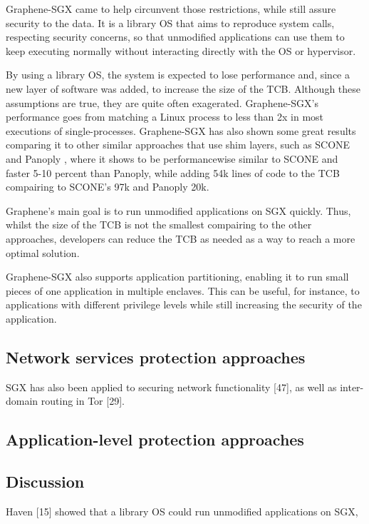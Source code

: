 Graphene-SGX \cite{graphenePaper} came to help circunvent those restrictions, while still assure security to the data. It is a library OS that aims to reproduce system calls, respecting security concerns, so that unmodified applications can use them to keep executing normally without interacting directly with the OS or hypervisor. 

By using a library OS, the system is expected to lose performance and, since a new layer of software was added, to increase the size of the TCB. 
Although these assumptions are true, they are quite often exagerated. Graphene-SGX's performance goes from matching a Linux process to less than 2x in most executions of single-processes.
Graphene-SGX has also shown some great results comparing it to other similar approaches that use shim layers, such as SCONE \cite{sconePaper} and Panoply \cite{panoplyPaper}, where it shows to be performancewise similar to SCONE and faster 5-10 percent than Panoply, while adding 54k lines of code to the TCB compairing to SCONE's 97k and Panoply 20k.

Graphene's main goal is to run unmodified applications on SGX quickly. Thus, whilst the size of the TCB is not the smallest compairing to the other approaches, developers can reduce the TCB as needed as a way to reach a more optimal solution. 

Graphene-SGX also supports application partitioning, enabling it to run small pieces of one application in multiple enclaves. This can be useful, for instance, to applications with different privilege levels while still increasing the security of the application.

\subsection{Network services protection approaches}

SGX has
also been applied to securing network functionality [47],
as well as inter-domain routing in Tor [29].

\subsection{Application-level protection approaches}

\subsection{Discussion}

Haven [15] showed
that a library OS could run unmodified applications on
SGX,

